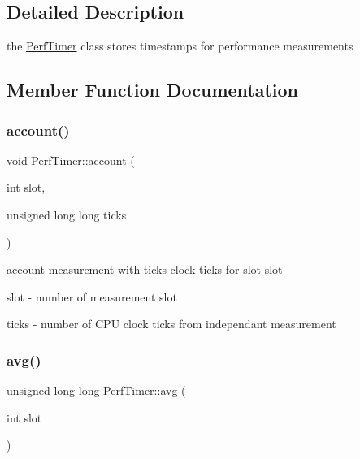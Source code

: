 \subsection{Detailed Description}
the \hyperlink{classPerfTimer}{Perf\+Timer} class stores timestamps for performance measurements 

\subsection{Member Function Documentation}
\mbox{\label{classPerfTimer_afda4ca8efb7e0546908a47857d5e3f87}} 
\subsubsection{\texorpdfstring{account()}{account()}}
{\footnotesize\ttfamily void Perf\+Timer\+::account (\begin{DoxyParamCaption}\item[{int}]{slot,  }\item[{unsigned long long}]{ticks }\end{DoxyParamCaption})}



account measurement with \textquotesingle{}ticks\textquotesingle{} clock ticks for slot \textquotesingle{}slot\textquotesingle{} 

\begin{DoxyItemize}
\item {\ttfamily slot} -\/ number of measurement slot \item {\ttfamily ticks} -\/ number of C\+PU clock ticks from independant measurement \end{DoxyItemize}
\mbox{\label{classPerfTimer_a1802fc2d85ce5c7ac9489d7a145099d9}} 
\subsubsection{\texorpdfstring{avg()}{avg()}}
{\footnotesize\ttfamily unsigned long long Perf\+Timer\+::avg (\begin{DoxyParamCaption}\item[{int}]{slot }\end{DoxyParamCaption})}



